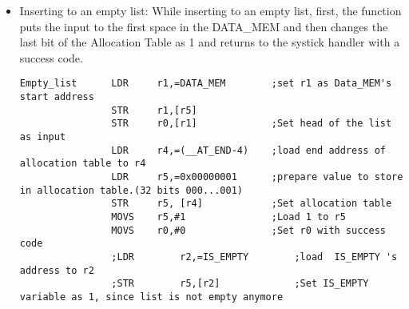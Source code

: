 \documentclass[pdftex,12pt,a4paper]{article}
\begin{document}
\begin{itemize}
    \item Inserting to an empty list: While inserting to an empty list, first, the function puts the input to the first space in the DATA\_MEM and then changes the last bit of the Allocation Table as 1 and returns to the systick handler with a success code.
    \begin{lstlisting}[caption=Inserting to an empty list, style=customasm]
    Empty_list		LDR		r1,=DATA_MEM		;set r1 as Data_MEM's start address
				STR		r1,[r5]
				STR		r0,[r1]				;Set head of the list as input		
				LDR		r4,=(__AT_END-4)	;load end address of allocation table to r4
				LDR		r5,=0x00000001		;prepare value to store in allocation table.(32 bits 000...001)
				STR 	r5, [r4]			;Set allocation table 
				MOVS	r5,#1				;Load 1 to r5
				MOVS	r0,#0				;Set r0 with success code
				;LDR		r2,=IS_EMPTY		;load  IS_EMPTY 's address to r2
				;STR		r5,[r2]				;Set IS_EMPTY variable as 1, since list is not empty anymore
				

\end{lstlisting}
\end{itemize}
\end{document}
